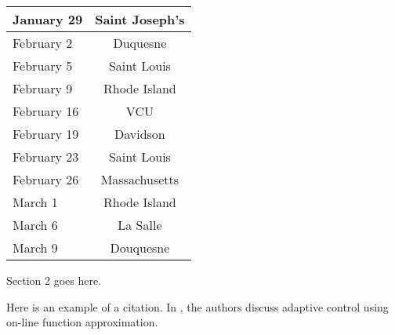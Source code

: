\begin{table}
\begin{center}
\begin{tabular}{||l|c||}
            \hline
            January 29 & Saint Joseph's \\
            \hline \hline
            February 2 & Duquesne \\
            \hline
            February 5 & Saint Louis \\
            \hline
            February 9 & Rhode Island \\
            \hline
            February 16 & VCU \\
            \hline
            February 19 & Davidson \\
            \hline
            February 23 & Saint Louis \\
            \hline
            February 26 & Massachusetts \\
            \hline \hline
            March 1 & Rhode Island \\
            \hline
            March 6 & La Salle \\
            \hline 
            March 9 & Douquesne \\
            \hline
        \end{tabular}
     \end{center}
\end{table}

Section 2 goes here.

Here is an example of a citation.  In \cite{JMRK2002}, the authors discuss adaptive control using on-line
function approximation.
